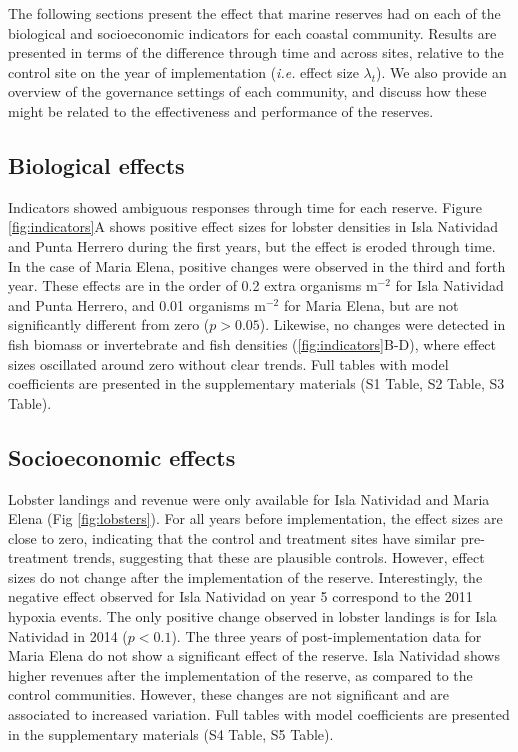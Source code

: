 \documentclass{frontiersSCNS}
\theoremstyle{definition}
\theoremstyle{definition}
\theoremstyle{definition}
\theoremstyle{remark}
\begin{document}
The following sections present the effect that marine reserves had on
each of the biological and socioeconomic indicators for each coastal
community. Results are presented in terms of the difference through time
and across sites, relative to the control site on the year of
implementation (\emph{i.e.} effect size \(\lambda_t\)). We also provide
an overview of the governance settings of each community, and discuss
how these might be related to the effectiveness and performance of the
reserves.

\subsection{Biological effects}\label{biological-effects}

Indicators showed ambiguous responses through time for each reserve.
Figure \ref{fig:indicators}A shows positive effect sizes for lobster
densities in Isla Natividad and Punta Herrero during the first years,
but the effect is eroded through time. In the case of Maria Elena,
positive changes were observed in the third and forth year. These
effects are in the order of 0.2 extra organisms \(\mathrm{m}^{-2}\) for
Isla Natividad and Punta Herrero, and 0.01 organisms \(\mathrm{m}^{-2}\)
for Maria Elena, but are not significantly different from zero
(\(p > 0.05\)). Likewise, no changes were detected in fish biomass or
invertebrate and fish densities (\ref{fig:indicators}B-D), where effect
sizes oscillated around zero without clear trends. Full tables with
model coefficients are presented in the supplementary materials (S1
Table, S2 Table, S3 Table).

\subsection{Socioeconomic effects}\label{socioeconomic-effects}

Lobster landings and revenue were only available for Isla Natividad and
Maria Elena (Fig \ref{fig:lobsters}). For all years before
implementation, the effect sizes are close to zero, indicating that the
control and treatment sites have similar pre-treatment trends,
suggesting that these are plausible controls. However, effect sizes do
not change after the implementation of the reserve. Interestingly, the
negative effect observed for Isla Natividad on year 5 correspond to the
2011 hypoxia events. The only positive change observed in lobster
landings is for Isla Natividad in 2014 (\(p < 0.1\)). The three years of
post-implementation data for Maria Elena do not show a significant
effect of the reserve. Isla Natividad shows higher revenues after the
implementation of the reserve, as compared to the control communities.
However, these changes are not significant and are associated to
increased variation. Full tables with model coefficients are presented
in the supplementary materials (S4 Table, S5 Table).
\end{document}
